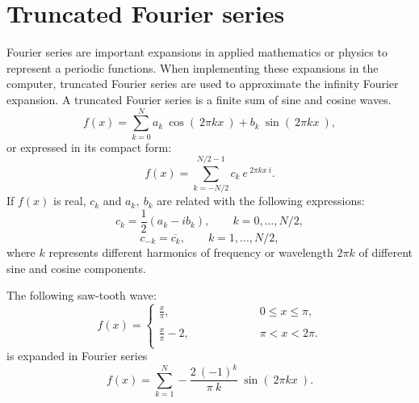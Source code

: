 \section{Truncated Fourier series}
Fourier series are important expansions in applied mathematics or physics to represent a
periodic functions.  
When implementing these expansions in the computer, truncated Fourier series are used
to approximate the infinity Fourier expansion.  
A truncated Fourier series is a finite sum of sine and cosine waves. 
\begin{equation}
f(x) = \sum_{k=0}^N a_k \ \cos( \ 2 \pi k  x \ ) + b_k \ \sin ( \ 2 \pi k  x \ ), 
\end{equation}
or expressed in its compact form: 
\begin{equation}
f(x) = \sum_{k=-N/2}^{N/2-1} c_k \ e^{ \ 2 \pi k  x \ i } .
\end{equation}
If $ f(x)$ is real, $ c_k $ and $a_k,\  b_k$ are related with the following expressions: 
\begin{equation}
c_k = \frac{1}{2}(a_k - i b_k), \qquad k=0, \ldots, N/2, 
\end{equation}
\begin{equation}
 c_{-k} = \overline{c_k},\qquad k=1, \ldots, N/2,
 \end{equation}
where $ k $ represents different harmonics of frequency or wavelength  $ 2 \pi k $  of different 
 sine and cosine components.

The following saw-tooth wave: 
\begin{equation}
f(x) =
\left\{
\begin{array}{ll}
\displaystyle                          
\frac{x}{\pi}, \hspace{1cm} \hspace{2cm} &  \displaystyle  0 \leq x \leq  \pi,      \\ \\
\displaystyle                                                            
\frac{x}{\pi} -2 ,  & \displaystyle    \pi < x <  2 \pi. 
\\                                                                                                 
\end{array}                                                                   
\right.                                                     
\end{equation}
is expanded in Fourier series
\begin{equation}
f(x) =\sum_{k=1}^N  - \frac{2 \ (-1)^{k}}{\pi \ k}   \ \sin ( \ 2 \pi k  x \ ).
\label{sawtooth}
\end{equation}



